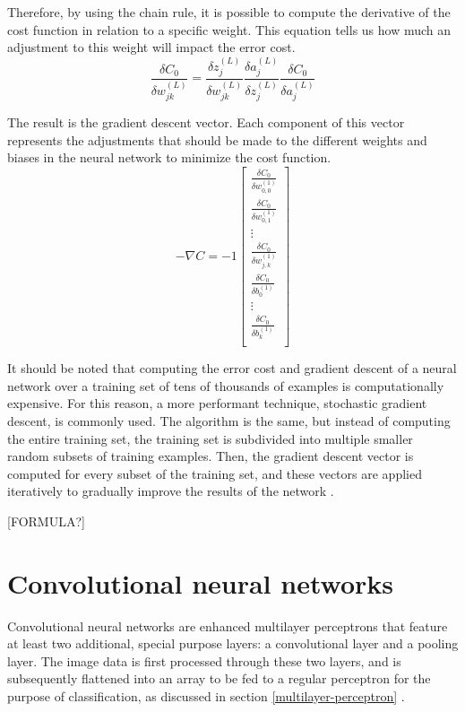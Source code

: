 \documentclass[12pt,a4paper,notitlepage]{article}
\begin{document}
Therefore, by using the chain rule, it is possible to compute the derivative of the cost function in relation to a specific weight. This equation tells us how much an adjustment to this weight will impact the error cost.
\begin{displaymath}
	\frac{\delta C_0}{\delta w_{jk}^{(L)}} = 
	\frac{\delta z_j^{(L)}}{\delta w_{jk}^{(L)}}
	\frac{\delta a_j^{(L)}}{\delta z_j^{(L)}}
	\frac{\delta C_0}{\delta a_j^{(L)}}
\end{displaymath}

The result is the gradient descent vector. Each component of this vector represents the adjustments that should be made to the different weights and biases in the neural network to minimize the cost function.
\begin{displaymath}
	-\nabla C =
	-1 \begin{bmatrix}
		\frac{\delta C_0}{\delta w_{0,0}^{(1)}}\\
		\frac{\delta C_0}{\delta w_{0,1}^{(1)}}\\
		\vdots\\
		\frac{\delta C_0}{\delta w_{j,k}^{(1)}}\\
		\frac{\delta C_0}{\delta b_{0}^{(1)}}\\
		\vdots\\
		\frac{\delta C_0}{\delta b_{k}^{(1)}}\\
	\end{bmatrix}
\end{displaymath}

It should be noted that computing the error cost and gradient descent of a neural network over a training set of tens of thousands of examples is computationally expensive. For this reason, a more performant technique, stochastic gradient descent, is commonly used. The algorithm is the same, but instead of computing the entire training set, the training set is subdivided into multiple smaller random subsets of training examples. Then, the gradient descent vector is computed for every subset of the training set, and these vectors are applied iteratively to gradually improve the results of the network \cite{sanderson_gradient_2017}.

[FORMULA?]

\section{Convolutional neural networks}
Convolutional neural networks are enhanced multilayer perceptrons that feature at least two additional, special purpose layers: a convolutional layer and a pooling layer. The image data is first processed through these two layers, and is subsequently flattened into an array to be fed to a regular perceptron for the purpose of classification, as discussed in section \ref{multilayer-perceptron} \cite{saha_comprehensive_2018}.
\end{document}
